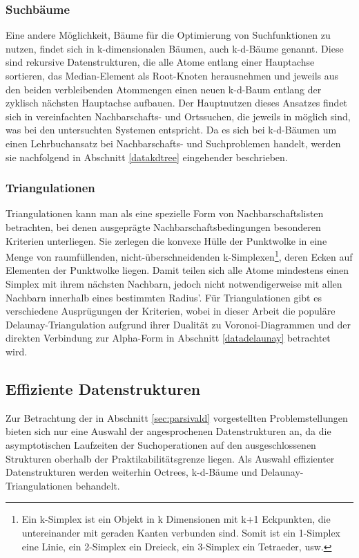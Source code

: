 \subsubsection{Suchbäume}

Eine andere Möglichkeit, Bäume für die Optimierung von Suchfunktionen zu nutzen, findet sich in k-dimensionalen Bäumen, auch k-d-Bäume genannt.
Diese sind rekursive Datenstrukturen, die alle Atome entlang einer Hauptachse sortieren, das Median-Element als Root-Knoten herausnehmen und jeweils aus den beiden verbleibenden Atommengen einen neuen k-d-Baum entlang der zyklisch nächsten Hauptachse aufbauen.
Der Hauptnutzen dieses Ansatzes findet sich in vereinfachten Nachbarschafts- und Ortssuchen, die jeweils in  möglich sind, was bei den untersuchten Systemen  entspricht.
Da es sich bei k-d-Bäumen um einen Lehrbuchansatz bei Nachbarschafts- und Suchproblemen handelt, werden sie nachfolgend in Abschnitt \ref{datakdtree} eingehender beschrieben.

\subsubsection{Triangulationen}

Triangulationen kann man als eine spezielle Form von Nachbarschaftslisten betrachten, bei denen ausgeprägte Nachbarschaftsbedingungen besonderen Kriterien unterliegen.
Sie zerlegen die konvexe Hülle der Punktwolke in eine Menge von raumfüllenden, nicht-überschneidenden k-Simplexen\footnote{Ein k-Simplex ist ein Objekt in k Dimensionen mit k+1 Eckpunkten, die untereinander mit geraden Kanten verbunden sind. Somit ist ein 1-Simplex eine Linie, ein 2-Simplex ein Dreieck, ein 3-Simplex ein Tetraeder, usw.}, deren Ecken auf Elementen der Punktwolke liegen.
Damit teilen sich alle Atome mindestens einen Simplex mit ihrem nächsten Nachbarn, jedoch nicht notwendigerweise mit allen Nachbarn innerhalb eines bestimmten Radius'.
Für Triangulationen gibt es verschiedene Ausprügungen der Kriterien, wobei in dieser Arbeit die populäre Delaunay-Triangulation aufgrund ihrer Dualität zu Voronoi-Diagrammen und der direkten Verbindung zur Alpha-Form in Abschnitt \ref{datadelaunay} betrachtet wird.

\subsection{Effiziente Datenstrukturen}

Zur Betrachtung der in Abschnitt \ref{sec:parsivald} vorgestellten Problemstellungen bieten sich nur eine Auswahl der angesprochenen Datenstrukturen an, da die asymptotischen Laufzeiten der Suchoperationen auf den ausgeschlossenen Strukturen oberhalb der Praktikabilitätsgrenze liegen.
Als Auswahl effizienter Datenstrukturen werden weiterhin Octrees, k-d-Bäume und Delaunay-Triangulationen behandelt.


